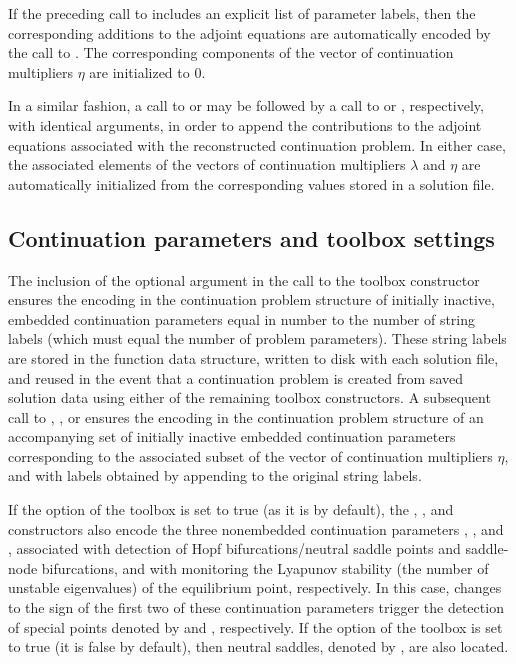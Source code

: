 If the preceding call to  includes an explicit list of parameter labels, then the corresponding additions to the adjoint equations are automatically encoded by the call to . The corresponding components of the vector of continuation multipliers $\eta$ are initialized to $0$.

In a similar fashion, a call to  or  may be followed by a call to  or , respectively, with identical arguments, in order to append the contributions to the adjoint equations associated with the reconstructed continuation problem. In either case, the associated elements of the vectors of continuation multipliers $\lambda$ and $\eta$ are automatically initialized from the corresponding values stored in a solution file.

\subsection{Continuation parameters and toolbox settings}

The inclusion of the  optional argument in the call to the  toolbox constructor ensures the encoding in the continuation problem structure of initially inactive, embedded continuation parameters equal in number to the number of string labels (which must equal the number of problem parameters). These string labels are stored in the function data structure, written to disk with each solution file, and reused in the event that a continuation problem is created from saved solution data using either of the remaining toolbox constructors. A subsequent call to , , or  ensures the encoding in the continuation problem structure of an accompanying set of initially inactive embedded continuation parameters corresponding to the associated subset of the vector of continuation multipliers $\eta$, and with labels obtained by appending  to the original string labels.

If the  option of the  toolbox is set to true (as it is by default), the , , and  constructors also encode the three nonembedded continuation parameters , , and , associated with detection of Hopf bifurcations/neutral saddle points and saddle-node bifurcations, and with monitoring the Lyapunov stability (the number of unstable eigenvalues) of the equilibrium point, respectively. In this case, changes to the sign of the first two of these continuation parameters trigger the detection of special points denoted by  and , respectively. If the  option of the  toolbox is set to true (it is false by default), then neutral saddles, denoted by , are also located.

